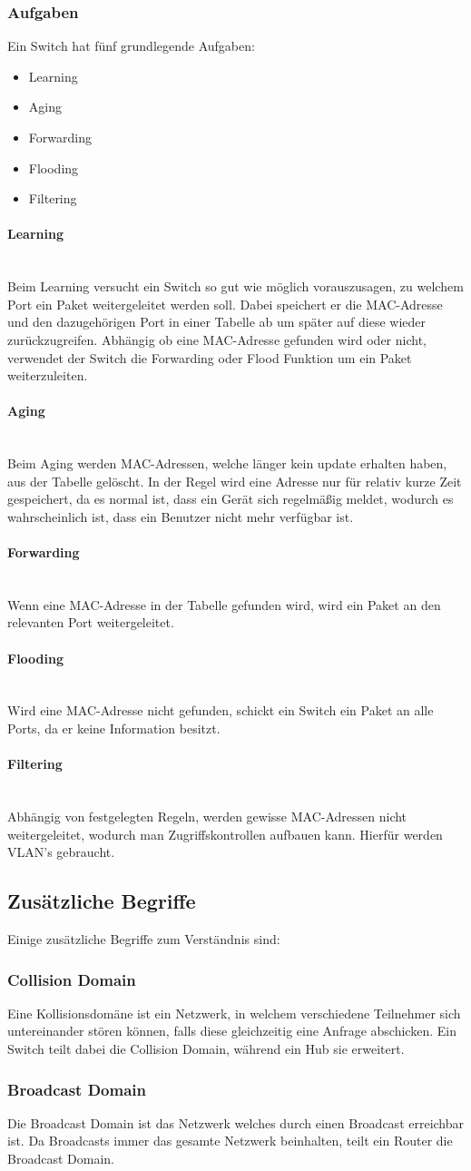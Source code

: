 \documentclass{article}
\newcommand{\paragraphlb}[1]{\paragraph{#1}\mbox{}\\}
\begin{document}
	\subsubsection{Aufgaben}
	Ein Switch hat fünf grundlegende Aufgaben:
	\begin{itemize}
		\item{Learning}
		\item{Aging}
		\item{Forwarding}
		\item{Flooding}
		\item{Filtering}
	\end{itemize}
	\paragraphlb{Learning}
	Beim Learning versucht ein Switch so gut wie möglich vorauszusagen, zu welchem Port ein Paket weitergeleitet werden soll. Dabei speichert er die MAC-Adresse und den dazugehörigen Port in einer Tabelle ab um später auf diese wieder zurückzugreifen. Abhängig ob eine MAC-Adresse gefunden wird oder nicht, verwendet der Switch die Forwarding oder Flood Funktion um ein Paket weiterzuleiten.
	\paragraphlb{Aging}
	Beim Aging werden MAC-Adressen, welche länger kein update erhalten haben, aus der Tabelle gelöscht. In der Regel wird eine Adresse nur für relativ kurze Zeit gespeichert, da es normal ist, dass ein Gerät sich regelmäßig meldet, wodurch es wahrscheinlich ist, dass ein Benutzer nicht mehr verfügbar ist.
	\paragraphlb{Forwarding}
	Wenn eine MAC-Adresse in der Tabelle gefunden wird, wird ein Paket an den relevanten Port weitergeleitet.
	\paragraphlb{Flooding}
	Wird eine MAC-Adresse nicht gefunden, schickt ein Switch ein Paket an alle Ports, da er keine Information besitzt.
	\paragraphlb{Filtering}
	Abhängig von festgelegten Regeln, werden gewisse MAC-Adressen nicht weitergeleitet, wodurch man Zugriffskontrollen aufbauen kann. Hierfür werden VLAN's gebraucht.
	\subsection{Zusätzliche Begriffe}
	Einige zusätzliche Begriffe zum Verständnis sind:
	\subsubsection{Collision Domain}
	Eine Kollisionsdomäne ist ein Netzwerk, in welchem verschiedene Teilnehmer sich untereinander stören können, falls diese gleichzeitig eine Anfrage abschicken. Ein Switch teilt dabei die Collision Domain, während ein Hub sie erweitert.
	\subsubsection{Broadcast Domain}
	Die Broadcast Domain ist das Netzwerk welches durch einen Broadcast erreichbar ist. Da Broadcasts immer das gesamte Netzwerk beinhalten, teilt ein Router die Broadcast Domain.
\end{document}

